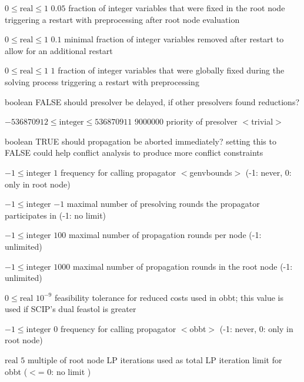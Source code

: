 %
{$0\leq\textrm{real}\leq1$}%
{$0.05$}%
{fraction of integer variables that were fixed in the root node triggering a restart with preprocessing after root node evaluation}%
{}

%
{$0\leq\textrm{real}\leq1$}%
{$0.1$}%
{minimal fraction of integer variables removed after restart to allow for an additional restart}%
{}

%
{$0\leq\textrm{real}\leq1$}%
{$1$}%
{fraction of integer variables that were globally fixed during the solving process triggering a restart with preprocessing}%
{}

%
{boolean}%
{FALSE}%
{should presolver be delayed, if other presolvers found reductions?}%
{}

%
{$-536870912\leq\textrm{integer}\leq536870911$}%
{$9000000$}%
{priority of presolver $<$trivial$>$}%
{}

%
{boolean}%
{TRUE}%
{should propagation be aborted immediately? setting this to FALSE could help conflict analysis to produce more conflict constraints}%
{}

%
{$-1\leq\textrm{integer}$}%
{$1$}%
{frequency for calling propagator $<$genvbounds$>$ (-1: never, 0: only in root node)}%
{}

%
{$-1\leq\textrm{integer}$}%
{$-1$}%
{maximal number of presolving rounds the propagator participates in (-1: no limit)}%
{}

%
{$-1\leq\textrm{integer}$}%
{$100$}%
{maximal number of propagation rounds per node (-1: unlimited)}%
{}

%
{$-1\leq\textrm{integer}$}%
{$1000$}%
{maximal number of propagation rounds in the root node (-1: unlimited)}%
{}

%
{$0\leq\textrm{real}$}%
{$10^{- 9}$}%
{feasibility tolerance for reduced costs used in obbt; this value is used if SCIP's dual feastol is greater}%
{}

%
{$-1\leq\textrm{integer}$}%
{$0$}%
{frequency for calling propagator $<$obbt$>$ (-1: never, 0: only in root node)}%
{}

%
{$\textrm{real}$}%
{$5$}%
{multiple of root node LP iterations used as total LP iteration limit for obbt ($<$= 0: no limit )}%
{}

